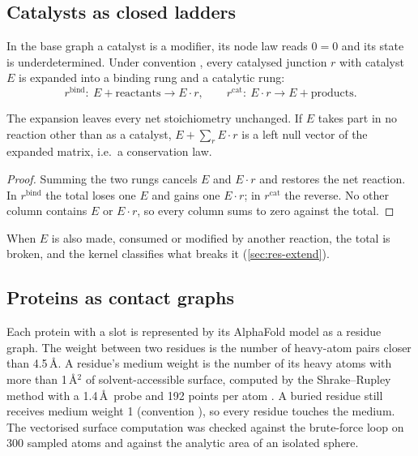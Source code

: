 \subsection{Catalysts as closed ladders}
\label{sec:enzyme}

In the base graph a catalyst is a modifier, its node law reads $0=0$ and its state is underdetermined.
Under convention , every catalysed junction $r$ with catalyst $E$ is expanded into a binding rung and a catalytic rung:
\begin{equation}
  r^{\mathrm{bind}}:\ E+\text{reactants}\to E{\cdot}r,\qquad
  r^{\mathrm{cat}}:\ E{\cdot}r\to E+\text{products}.
\end{equation}

\begin{proposition}
\label{prop:enzyme}
The expansion leaves every net stoichiometry unchanged.
If $E$ takes part in no reaction other than as a catalyst, $E+\sum_r E{\cdot}r$ is a left null vector of the expanded matrix, i.e.\ a conservation law.
\end{proposition}
\begin{proof}
Summing the two rungs cancels $E$ and $E{\cdot}r$ and restores the net reaction.
In $r^{\mathrm{bind}}$ the total loses one $E$ and gains one $E{\cdot}r$; in $r^{\mathrm{cat}}$ the reverse.
No other column contains $E$ or $E{\cdot}r$, so every column sums to zero against the total.
\end{proof}

When $E$ is also made, consumed or modified by another reaction, the total is broken, and the kernel classifies what breaks it (\cref{sec:res-extend}).

\subsection{Proteins as contact graphs}
\label{sec:proteins}
\label{sec:attach}

Each protein with a slot is represented by its AlphaFold model as a residue graph.
The weight between two residues is the number of heavy-atom pairs closer than 4.5\,\AA.
A residue's medium weight is the number of its heavy atoms with more than 1\,\AA$^2$ of solvent-accessible surface, computed by the Shrake--Rupley method with a 1.4\,\AA\ probe and 192 points per atom \citep{shrake1973environment}.
A buried residue still receives medium weight 1 (convention ), so every residue touches the medium.
The vectorised surface computation was checked against the brute-force loop on 300 sampled atoms and against the analytic area of an isolated sphere.

